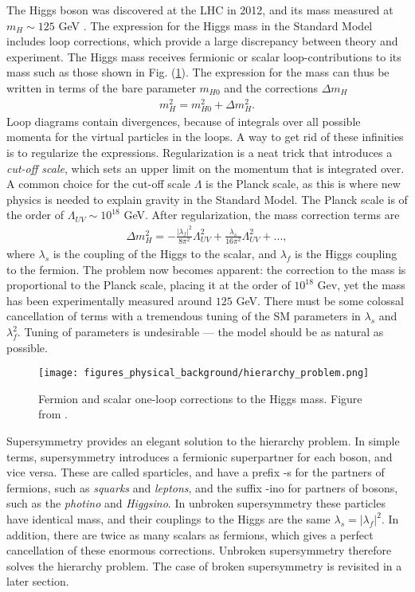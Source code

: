 \documentclass[twoside,english]{uiofysmaster}
\begin{document}
The Higgs boson was discovered at the LHC in 2012, and its mass  measured at $m_H \sim 125$ GeV \cite{20121}. The expression for the Higgs mass in the Standard Model includes loop corrections, which provide a large discrepancy between theory and experiment. The Higgs mass receives fermionic or scalar loop-contributions to its mass such as those shown in Fig. (\ref{Fig:: Phys. bac.: Higgs mass contributions}). The expression for the mass can thus be written in terms of the bare parameter $m_{H0}$ and the corrections $\Delta m_H$
\begin{align*}
m_H^2 = m_{H0}^2 + \Delta m_H^2.
\end{align*}
Loop diagrams contain divergences, because of integrals over all possible momenta for the virtual particles in the loops. A way to get rid of these infinities is to regularize the expressions. Regularization is a neat trick that introduces a \textit{cut-off scale}, which sets an upper limit on the momentum that is integrated over. A common choice for the cut-off scale $\Lambda$ is the Planck scale, as this is where new physics is needed to explain gravity in the Standard Model. The Planck scale is of the order of $\Lambda_{UV} \sim 10^{18}$ GeV. After regularization, the mass correction terms are
\begin{align}
\Delta m_H^2 = - \frac{|\lambda_f|^2}{8\pi^2} \Lambda_{UV}^2 + \frac{\lambda_s}{16\pi^2} \Lambda_{UV}^2 +...,
\end{align}
where $\lambda_s$ is the coupling of the Higgs to the scalar, and $\lambda_f$ is the Higgs coupling to the fermion. The problem now becomes apparent: the correction to the mass is proportional to the Planck scale, placing it at the order of $10^{18}$ Gev, yet the mass has been experimentally measured around $125$ GeV. There must be some colossal cancellation of terms with a tremendous tuning of the SM parameters in $\lambda_s$ and $\lambda_f^2$. Tuning of parameters is undesirable --- the model should be as natural as possible. 

\begin{figure}[H]
\centering
\texttt{[image: figures\_physical\_background/hierarchy\_problem.png]}
\caption{Fermion and scalar one-loop corrections to the Higgs mass. Figure from \cite{batzing2017lecture}.}
\label{Fig:: Phys. bac.: Higgs mass contributions}
\end{figure}

Supersymmetry provides an elegant solution to the hierarchy problem. In simple terms, supersymmetry introduces a fermionic superpartner for each boson, and vice versa. These are called sparticles, and have a prefix -s for the partners of fermions, such as \textit{squarks} and \textit{leptons}, and the suffix -ino for partners of bosons, such as the \textit{photino} and \textit{Higgsino}. In unbroken supersymmetry these particles have identical mass, and their couplings to the Higgs are the same $\lambda_s = |\lambda_f|^2$. In addition, there are twice as many scalars as fermions, which gives a perfect cancellation of these enormous corrections. Unbroken supersymmetry therefore solves the hierarchy problem. The case of broken supersymmetry is revisited in a later section.
\end{document}
